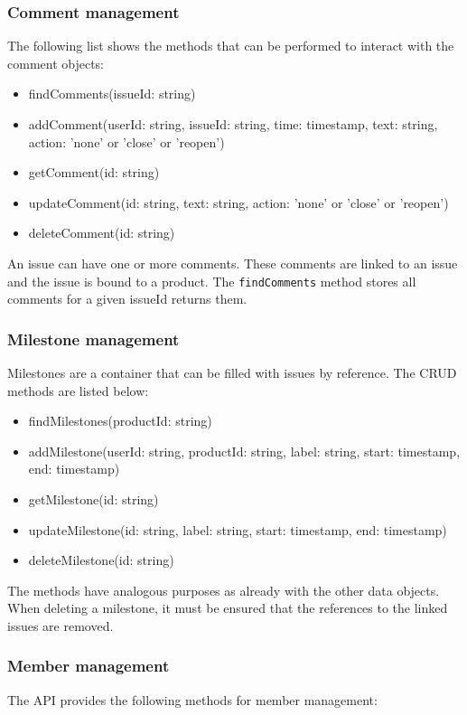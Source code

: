     \subsubsection*{Comment management}
    The following list shows the methods that can be performed to interact with the comment objects:
    \begin{itemize}
        \item findComments(issueId: string)
        \item addComment(userId: string, issueId: string, time: timestamp, text: string, action: 'none' or 'close' or 'reopen')
        \item getComment(id: string)
        \item updateComment(id: string, text: string, action: 'none' or 'close' or 'reopen')
        \item deleteComment(id: string)
    \end{itemize}

    An issue can have one or more comments. These comments are linked to an issue and the issue is bound to a product. The \texttt{findComments} method stores all comments for a given issueId returns them. 

    \subsubsection*{Milestone management}
    Milestones are a container that can be filled with issues by reference. The CRUD methods are listed below:
    \begin{itemize}
        \item findMilestones(productId: string)
        \item addMilestone(userId: string, productId: string, label: string, start: timestamp, end: timestamp)
        \item getMilestone(id: string)
        \item updateMilestone(id: string, label: string, start: timestamp, end: timestamp)
        \item deleteMilestone(id: string)
    \end{itemize}

    The methods have analogous purposes as already with the other data objects. When deleting a milestone, it must be ensured that the references to the linked issues are removed.

    \subsubsection*{Member management}
    The API provides the following methods for member management:

